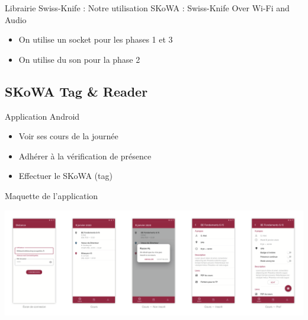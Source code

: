\documentclass[aspectratio=169]{beamer}
\begin{document}
\begin{frame}{Librairie Swiss-Knife : Notre utilisation}
  SKoWA : Swiss-Knife Over Wi-Fi and Audio
  \bigskip

  \begin{itemize}
    \item On utilise un socket pour les phases 1 et 3
    \item On utilise du son pour la phase 2
  \end{itemize}
\end{frame}

\subsection{SKoWA Tag \& Reader}

\begin{frame}{Application Android}

  \begin{itemize}
    \item Voir ses cours de la journée
    \item Adhérer à la vérification de présence
    \item Effectuer le SKoWA (tag)
  \end{itemize}

\end{frame}

\begin{frame}{Maquette de l'application}
  \begin{adjustwidth}{-1.8em}{2em}
    \centering
    \includegraphics[width=1.1\textwidth]{../assets/maquette.png}
  \end{adjustwidth}
\end{frame}
\end{document}
